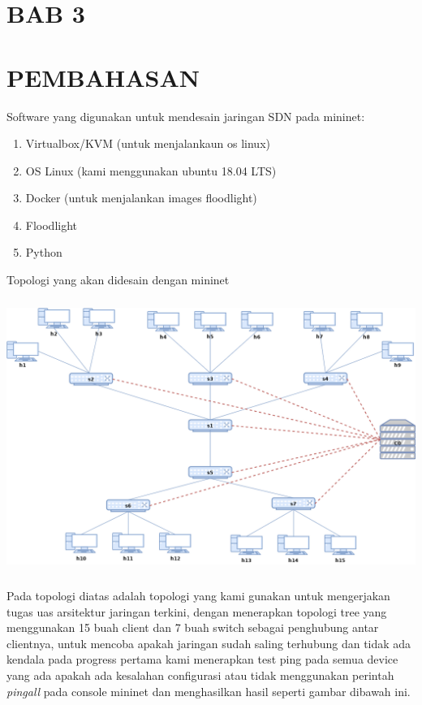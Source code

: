 \section{BAB 3}
\section{PEMBAHASAN}
Software yang digunakan untuk mendesain jaringan SDN pada mininet:
\liststyleLvii
\begin{enumerate}
\item Virtualbox/KVM (untuk menjalankaun os linux)
\item OS Linux (kami menggunakan ubuntu 18.04 LTS)
\item Docker (untuk menjalankan images floodlight)
\item Floodlight
\item Python
\end{enumerate}

Topologi yang akan didesain dengan mininet
\begin{center}
\includegraphics[width=5.5925in,height=3.5091in]{gambar/topologi.png}
\end{center}

Pada topologi diatas adalah topologi yang kami gunakan untuk mengerjakan tugas uas arsitektur jaringan terkini,
dengan menerapkan topologi tree yang menggunakan 15 buah client dan 7 buah switch sebagai penghubung antar clientnya,
untuk mencoba apakah jaringan sudah saling terhubung dan tidak ada kendala pada progress pertama kami menerapkan test
ping pada semua device yang ada apakah ada kesalahan configurasi atau tidak menggunakan perintah \textit{pingall }pada
console mininet dan menghasilkan hasil seperti gambar dibawah ini.


